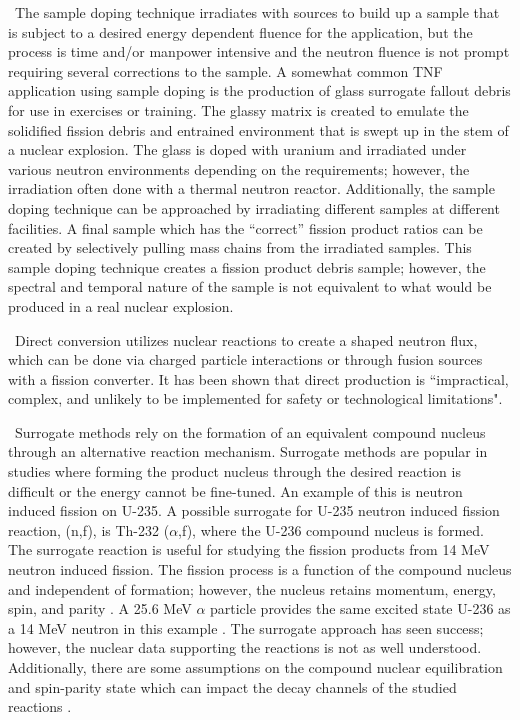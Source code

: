 \ The sample doping technique irradiates with sources to build up a sample that is subject to a desired energy dependent fluence for the application, but the process is time and/or manpower intensive and the neutron fluence is not prompt requiring several corrections to the sample. 
A somewhat common TNF application using sample doping is the production of glass surrogate fallout debris for use in exercises or training\cite{Carney2014b}. 
The glassy matrix is created to emulate the solidified fission debris and entrained environment that is swept up in the stem of a nuclear explosion. 
The glass is doped with uranium and irradiated under various neutron environments depending on the requirements; however, the irradiation often done with a thermal neutron reactor. 
Additionally, the sample doping technique can be approached by irradiating different samples at different facilities. A final sample which has the ``correct'' fission product ratios can be created by selectively pulling mass chains from  the irradiated samples. 
This sample doping technique creates a fission product debris sample; however, the spectral and temporal nature of the sample is not equivalent to what would be produced in a real nuclear explosion.

\ Direct conversion utilizes nuclear reactions to create a shaped neutron flux, which can be done via charged particle interactions or through fusion sources with a fission converter. 
It has been shown that direct production is ``impractical, complex, and unlikely to be implemented for safety or technological limitations"\cite{Bevins}. 

\ Surrogate methods rely on the formation of an equivalent compound nucleus through an alternative reaction mechanism\cite{DIETRICH2007237,Scielzo2012}. 
Surrogate methods are popular in studies where forming the product nucleus through the desired reaction is difficult or the energy cannot be fine-tuned. 
An example of this is neutron induced fission on U-235. 
A possible surrogate for U-235 neutron induced fission reaction, (n,f), is Th-232 ($\alpha$,f), where the U-236 compound nucleus is formed. The surrogate reaction is useful for studying the fission products from 14 MeV neutron induced fission. The fission process is a function of the compound nucleus and independent of formation; however, the nucleus retains momentum, energy, spin, and parity \cite{Narek1}. A 25.6 MeV $\alpha$ particle provides the same excited state U-236 as a 14 MeV neutron in this example \cite{Narek1}. The surrogate approach has seen success; however, the nuclear data supporting the reactions is not as well understood\cite{RevModPhys.84.353,Narek1}. 
Additionally, there are some assumptions on the compound nuclear equilibration and spin-parity state which can impact the decay channels of the studied reactions \cite{DIETRICH2007237}.

